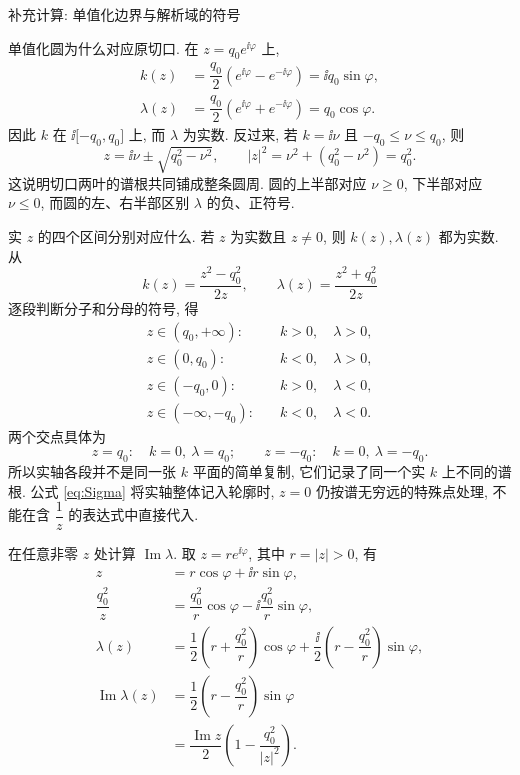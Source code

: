 \par\medskip\noindent 补充计算: 单值化边界与解析域的符号\par
\par\smallskip\noindent 单值化圆为什么对应原切口.\quad
在 $z=q_0e^{\ii\varphi}$ 上,
\begin{align*}
k(z)
&=\dfrac{q_0}{2}(e^{\ii\varphi}-e^{-\ii\varphi})
=\ii q_0\sin\varphi,\\
\lambda(z)
&=\dfrac{q_0}{2}(e^{\ii\varphi}+e^{-\ii\varphi})
=q_0\cos\varphi.
\end{align*}
因此 $k$ 在 $\ii\lbrack-q_0,q_0\rbrack$ 上, 而 $\lambda$ 为实数. 反过来, 若 $k=\ii\nu$ 且 $-q_0\le\nu\le q_0$, 则
\begin{equation*}
z=\ii\nu\pm\sqrt{q_0^2-\nu^2},
\qquad
|z|^2=\nu^2+(q_0^2-\nu^2)=q_0^2.
\end{equation*}
这说明切口两叶的谱根共同铺成整条圆周. 圆的上半部对应 $\nu\ge0$, 下半部对应 $\nu\le0$, 而圆的左、右半部区别 $\lambda$ 的负、正符号.
\par\smallskip\noindent 实 $z$ 的四个区间分别对应什么.\quad
若 $z$ 为实数且 $z\ne0$, 则 $k(z),\lambda(z)$ 都为实数. 从
\begin{equation*}
k(z)=\dfrac{z^2-q_0^2}{2z},
\qquad
\lambda(z)=\dfrac{z^2+q_0^2}{2z}
\end{equation*}
逐段判断分子和分母的符号, 得
\begin{align*}
z\in(q_0,+\infty):\quad&k>0,\quad\lambda>0,\\
z\in(0,q_0):\quad&k<0,\quad\lambda>0,\\
z\in(-q_0,0):\quad&k>0,\quad\lambda<0,\\
z\in(-\infty,-q_0):\quad&k<0,\quad\lambda<0.
\end{align*}
两个交点具体为
\begin{equation*}
z=q_0:\quad k=0,\ \lambda=q_0;
\qquad
z=-q_0:\quad k=0,\ \lambda=-q_0.
\end{equation*}
所以实轴各段并不是同一张 $k$ 平面的简单复制, 它们记录了同一个实 $k$ 上不同的谱根. 公式 \eqref{eq:Sigma} 将实轴整体记入轮廓时, $z=0$ 仍按谱无穷远的特殊点处理, 不能在含 $\dfrac{1}{z}$ 的表达式中直接代入.
\par\smallskip\noindent 在任意非零 $z$ 处计算 $\operatorname{Im}\lambda$.\quad
取 $z=re^{\ii\varphi}$, 其中 $r=|z|>0$, 有
\begin{align*}
z&=r\cos\varphi+\ii r\sin\varphi,\\
\dfrac{q_0^2}{z}
&=\dfrac{q_0^2}{r}\cos\varphi
-\ii\dfrac{q_0^2}{r}\sin\varphi,\\
\lambda(z)
&=\dfrac{1}{2}\left(r+\dfrac{q_0^2}{r}\right)\cos\varphi
+\dfrac{\ii}{2}\left(r-\dfrac{q_0^2}{r}\right)\sin\varphi,\\
\operatorname{Im}\lambda(z)
&=\dfrac{1}{2}\left(r-\dfrac{q_0^2}{r}\right)\sin\varphi\\
&=\dfrac{\operatorname{Im}z}{2}
\left(1-\dfrac{q_0^2}{|z|^2}\right).
\end{align*}
